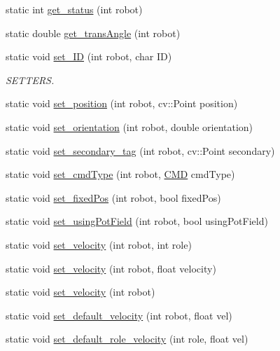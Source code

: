 \begin{DoxyCompactItemize}
\item 
static int \hyperlink{class_robots_abb471ba5ef5331f0488a9490d1af0c86}{get\+\_\+status} (int robot)
\item 
static double \hyperlink{class_robots_af3cabeacfb88dd920f581939935e76ca}{get\+\_\+trans\+Angle} (int robot)
\item 
static void \hyperlink{class_robots_aea3f1278d0503cd81adc9ceea0a7d1df}{set\+\_\+\+ID} (int robot, char ID)
\begin{DoxyCompactList}\small\item\em S\+E\+T\+T\+E\+RS. \end{DoxyCompactList}\item 
static void \hyperlink{class_robots_a96ac427f418c25db0c74295f75a58cbb}{set\+\_\+position} (int robot, cv\+::\+Point position)
\item 
static void \hyperlink{class_robots_a9040aa6c409fe67186aaa52f9183b7c1}{set\+\_\+orientation} (int robot, double orientation)
\item 
static void \hyperlink{class_robots_a40620e7ef7a3003736ab1c0b82c2b3b2}{set\+\_\+secondary\+\_\+tag} (int robot, cv\+::\+Point secondary)
\item 
static void \hyperlink{class_robots_a748870113b457e47bccaf4cd329f4378}{set\+\_\+cmd\+Type} (int robot, \hyperlink{class_robots_adcc7ae7fbb9bdc57a26ee70fa1ae88e5}{C\+MD} cmd\+Type)
\item 
static void \hyperlink{class_robots_a427266e3332ab91bb3a78b5fb61a6c2c}{set\+\_\+fixed\+Pos} (int robot, bool fixed\+Pos)
\item 
static void \hyperlink{class_robots_a51288c53411bda98c5f9cd05f6ef2a82}{set\+\_\+using\+Pot\+Field} (int robot, bool using\+Pot\+Field)
\item 
static void \hyperlink{class_robots_ae37da9b7ca9d84bee564c328db139758}{set\+\_\+velocity} (int robot, int role)
\item 
static void \hyperlink{class_robots_a0079dd423110e51fb7ce64dc49fdb1c9}{set\+\_\+velocity} (int robot, float velocity)
\item 
static void \hyperlink{class_robots_a89002b0b36b894c17652c91bc6c73d59}{set\+\_\+velocity} (int robot)
\item 
static void \hyperlink{class_robots_a54b514022589049ad5ae94ac11a453cd}{set\+\_\+default\+\_\+velocity} (int robot, float vel)
\item 
static void \hyperlink{class_robots_ae167e64868239ece6c9f5b35d6f6ba43}{set\+\_\+default\+\_\+role\+\_\+velocity} (int role, float vel)
\item 

\end{DoxyCompactItemize}
